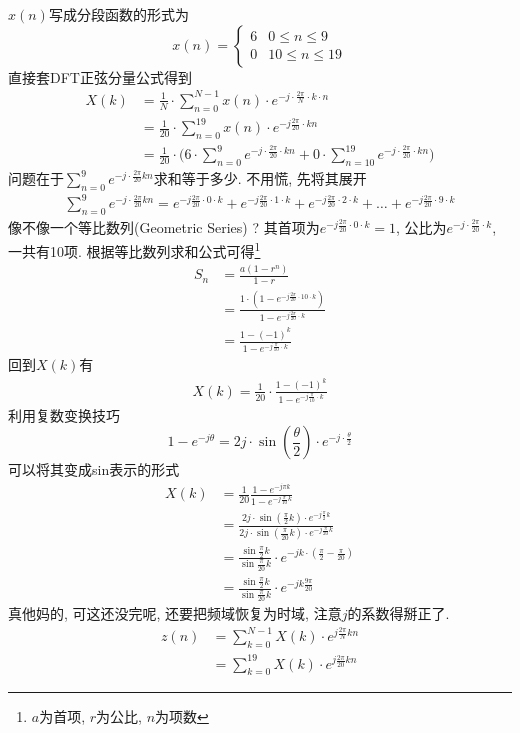 \documentclass[a4paper]{report}
\begin{document}
$x(n)$写成分段函数的形式为
$$x(n)=\begin{cases}
  6&0\leq n \leq 9
  \\ 0&10\leq n \leq 19
\end{cases}$$
直接套DFT正弦分量公式得到
\begin{align*}
  X(k)&=\frac{1}{N}\cdot \displaystyle\sum_{n=0}^{N-1} x(n)\cdot e^{-j\cdot\frac{2\pi}{N}\cdot k\cdot n}\\
  &=\frac{1}{20}\cdot \displaystyle\sum_{n=0}^{19}x(n)\cdot e^{-j\frac{2\pi}{20}\cdot kn}\\
  &=\frac{1}{20}\cdot \bigg(6\cdot \displaystyle\sum_{n=0}^{9}e^{-j\cdot\frac{2\pi}{20}\cdot kn}+0\cdot \displaystyle\sum_{n=10}^{19}e^{-j\cdot\frac{2\pi}{20}\cdot kn}\bigg)
\end{align*}
问题在于$\sum_{n=0}^{9}e^{-j\cdot\frac{2\pi}{20}kn}$求和等于多少. 不用慌, 先将其展开
\begin{align*}
  \displaystyle\sum_{n=0}^{9}e^{-j\cdot\frac{2\pi}{20}kn}=e^{-j\frac{2\pi}{20}\cdot 0\cdot k}+e^{-j\frac{2\pi}{20}\cdot 1\cdot k}+e^{-j\frac{2\pi}{20}\cdot 2 \cdot k}+\dots+e^{-j\frac{2\pi}{20}\cdot 9\cdot k}
\end{align*}
像不像一个等比数列(Geometric Series) ? 其首项为$e^{-j\frac{2\pi}{20}\cdot 0\cdot k}=1$, 公比为$e^{-j\cdot\frac{2\pi}{20}\cdot k}$, 一共有10项. 
根据等比数列求和公式可得\footnote{$a$为首项, $r$为公比, $n$为项数}
\begin{align*}
  S_n&=\frac{a(1-r^n)}{1-r}
  \\ &=\frac{1\cdot(1-e^{-j\frac{2\pi}{20}\cdot 10\cdot k})}{1-e^{-j\frac{2\pi}{20}\cdot k}}
  \\ &=\frac{1-(-1)^k}{1-e^{-j\frac{\pi}{10}\cdot k}}
\end{align*}
回到$X(k)$有
\begin{align*}
  X(k)=\frac{1}{20}\cdot \frac{1-(-1)^k}{1-e^{-j\frac{\pi}{10}\cdot k}}
\end{align*}
利用复数变换技巧
\begin{equation}
  1-e^{-j\theta}=2j\cdot\sin{(\frac{\theta}{2})}\cdot e^{-j\cdot\frac{\theta}{2}}
\end{equation}
可以将其变成sin表示的形式
\begin{align*}
  X(k)&=\frac{1}{20}\frac{1-e^{-j\pi k}}{1-e^{-j\frac{\pi}{10}k}}
  \\ &=\frac{2j\cdot \sin{(\frac{\pi}{2}k)}\cdot e^{-j\frac{\pi}{2}k}}{2j\cdot \sin{(\frac{\pi}{20}k)}\cdot e^{-j\frac{\pi}{20}k}}
  \\ &=\frac{\sin{\frac{\pi}{2}k}}{\sin{\frac{\pi}{20}k}}\cdot e^{-jk\cdot(\frac{\pi}{2}-\frac{\pi}{20})}
  \\ &=\frac{\sin{\frac{\pi}{2}k}}{\sin{\frac{\pi}{20}k}}\cdot e^{-jk\frac{9\pi}{20}}
\end{align*}
真他妈的, 可这还没完呢, 还要把频域恢复为时域, 注意$j$的系数得掰正了. 
\begin{align*}
  z(n)&=\displaystyle\sum_{k=0}^{N-1}X(k)\cdot e^{j\frac{2\pi}{N}kn}
\\  &=\displaystyle\sum_{k=0}^{19}X(k)\cdot e^{j\frac{2\pi}{20}kn}
\end{align*}
\end{document}

